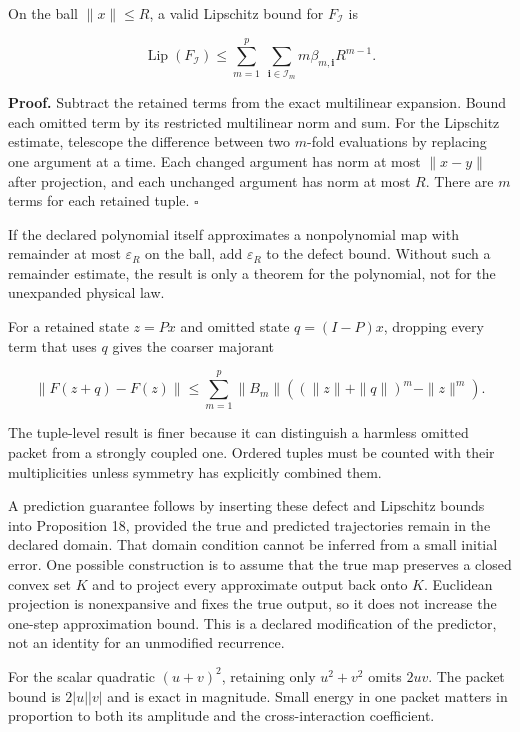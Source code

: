 On the ball \(\|x\|\leq R\), a valid Lipschitz bound for
\(F_{\mathcal I}\) is

\[
\operatorname{Lip}(F_{\mathcal I})
\leq\sum_{m=1}^{p}\ \sum_{\boldsymbol i\in\mathcal I_m}
m\beta_{m,\boldsymbol i}R^{m-1}.
\]

\textbf{Proof.} Subtract the retained terms from the exact multilinear
expansion. Bound each omitted term by its restricted multilinear norm
and sum. For the Lipschitz estimate, telescope the difference between
two \(m\)-fold evaluations by replacing one argument at a time. Each
changed argument has norm at most \(\|x-y\|\) after projection, and each
unchanged argument has norm at most \(R\). There are \(m\) terms for
each retained tuple. \(\square\)

If the declared polynomial itself approximates a nonpolynomial map with
remainder at most \(\varepsilon_R\) on the ball, add \(\varepsilon_R\)
to the defect bound. Without such a remainder estimate, the result is
only a theorem for the polynomial, not for the unexpanded physical law.

For a retained state \(z=Px\) and omitted state \(q=(I-P)x\), dropping
every term that uses \(q\) gives the coarser majorant

\[
\|F(z+q)-F(z)\|
\leq\sum_{m=1}^{p}\|B_m\|
\left((\|z\|+\|q\|)^m-\|z\|^m\right).
\]

The tuple-level result is finer because it can distinguish a harmless
omitted packet from a strongly coupled one. Ordered tuples must be
counted with their multiplicities unless symmetry has explicitly
combined them.

A prediction guarantee follows by inserting these defect and Lipschitz
bounds into Proposition 18, provided the true and predicted trajectories
remain in the declared domain. That domain condition cannot be inferred
from a small initial error. One possible construction is to assume that
the true map preserves a closed convex set \(K\) and to project every
approximate output back onto \(K\). Euclidean projection is nonexpansive
and fixes the true output, so it does not increase the one-step
approximation bound. This is a declared modification of the predictor,
not an identity for an unmodified recurrence.

For the scalar quadratic \((u+v)^2\), retaining only \(u^2+v^2\) omits
\(2uv\). The packet bound is \(2|u||v|\) and is exact in magnitude.
Small energy in one packet matters in proportion to both its amplitude
and the cross-interaction coefficient.

